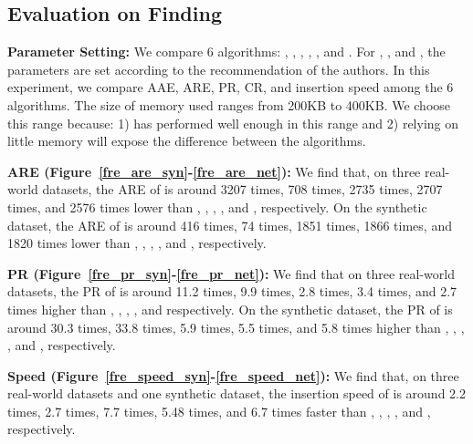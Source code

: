 \presub
\subsection{Evaluation on Finding \taskone} \postsub
\label{eva_one}

\noindent\textbf{Parameter Setting:}
%
%
We compare 6 algorithms: \sketchname, \freCM\cite{cmsketch}, \freCU\cite{cusketch}, \freCF\cite{coldfilter}, \freSS\cite{spacesaving}, and \freunbia\cite{unbiasedsketch}.
For \freCM, \freCU{}, and \freCF, the parameters are set according to the recommendation of the authors.
In this experiment, we compare AAE, ARE, PR, CR, and insertion speed among the 6 algorithms.
The size of memory used ranges from 200KB to 400KB. We choose this range because: 1) \sketchname{} has performed well enough in this range and 2) relying on little memory will expose the difference between the algorithms.
			
\noindent\textbf{ARE (Figure~\ref{fre_are_syn}-\ref{fre_are_net}):}
We find that, on three real-world datasets, the ARE of \sketchname{} is around 3207 times, 708 times, 2735 times, 2707 times, and 2576 times lower than \freCM, \freCU, \freCF, \freSS{}, and \freunbia{}, respectively. On the synthetic dataset, the ARE of \sketchname{} is around 416 times, 74 times, 1851 times, 1866 times, and 1820 times lower than \freCM, \freCU, \freCF, \freSS{}, and \freunbia{}, respectively.
			
\noindent\textbf{PR (Figure~\ref{fre_pr_syn}-\ref{fre_pr_net}):}
We find that on three real-world datasets, the PR of \sketchname{} is around 11.2 times, 9.9 times, 2.8 times, 3.4 times, and 2.7 times higher than \freCM, \freCU, \freCF, \freSS{}, and \freunbia{} respectively. On the synthetic dataset, the PR of \sketchname{} is around 30.3 times, 33.8 times, 5.9 times, 5.5 times, and 5.8 times higher than \freCM, \freCU, \freCF, \freSS{}, and \freunbia{}, respectively.
	
	
			
\noindent\textbf{Speed (Figure~\ref{fre_speed_syn}-\ref{fre_speed_net}):}
We find that, on three real-world datasets and one synthetic dataset, the insertion speed of \sketchname{} is around 2.2 times, 2.7 times, 7.7 times, 5.48 times, and 6.7 times faster than \freCM, \freCU, \freCF, \freSS{}, and \freunbia{}, respectively.


